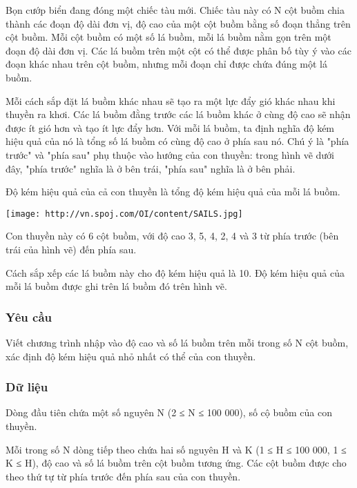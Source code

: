 







   Bọn cướp biển đang đóng một chiếc tàu mới. Chiếc tàu này có N cột buồm chia thành các đoạn độ dài đơn vị, độ cao của một cột buồm bằng số đoạn thẳng trên cột buồm. Mỗi cột buồm có một số lá buồm, mỗi lá buồm nằm gọn trên một đoạn độ dài đơn vị. Các lá buồm trên một cột có thể được phân bố tùy ý vào các đoạn khác nhau trên cột buồm, nhưng mỗi đoạn chỉ được chứa đúng một lá buồm.  

   Mỗi cách sắp đặt lá buồm khác nhau sẽ tạo ra một lực đẩy gió khác nhau khi thuyền ra khơi. Các lá buồm đằng trước các lá buồm khác ở cùng độ cao sẽ nhận được ít gió hơn và tạo ít lực đẩy hơn. Với mỗi lá buồm, ta định nghĩa độ kém hiệu quả của nó là tổng số lá buồm có cùng độ cao ở phía sau nó. Chú ý là "phía trước" và "phía sau" phụ thuộc vào hướng của con thuyền: trong hình vẽ dưới đây, "phía trước" nghĩa là ở bên trái, "phía sau" nghĩa là ở bên phải.  

   Độ kém hiệu quả của cả con thuyền là tổng độ kém hiệu quả của mỗi lá buồm.  


\texttt{[image: http://vn.spoj.com/OI/content/SAILS.jpg]}

   Con thuyền này có 6 cột buồm, với độ cao 3, 5, 4, 2, 4 và 3 từ phía trước (bên trái của hình vẽ) đến phía sau.  

   Cách sắp xếp các lá buồm này cho độ kém hiệu quả là 10. Độ kém hiệu quả của mỗi lá buồm được ghi trên lá buồm đó trên hình vẽ.  

\subsubsection{   Yêu cầu  }

   Viết chương trình nhập vào độ cao và số lá buồm trên mỗi trong số N cột buồm, xác định độ kém hiệu quả nhỏ nhất có thể của con thuyền.  

\subsubsection{   Dữ liệu  }

   Dòng đầu tiên chứa một số nguyên N (2 ≤ N ≤ 100 000), số cộ buồm của con thuyền.  

   Mỗi trong số N dòng tiếp theo chứa hai số nguyên H và K (1 ≤ H ≤ 100 000, 1 ≤ K ≤ H), độ cao và số lá buồm trên cột buồm tương ứng. Các cột buồm được cho theo thứ tự từ phía trước đến phía sau của con thuyền.  

